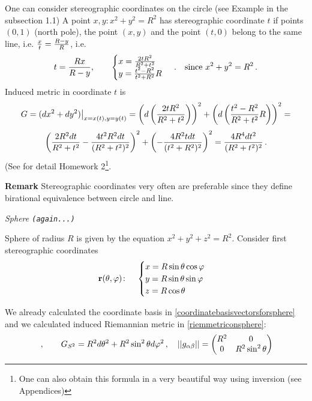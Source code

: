 \documentclass[12pt]{article}
\theoremstyle{theorem}
\numberwithin{equation}{section}
\begin{document}
One can consider stereographic coordinates on the circle (see Example in the subsection 1.1)
A point $x,y\colon x^2+y^2=R^2$ has stereographic coordinate $t$ if points $(0,1)$ (north pole),
the point $(x,y)$ and the point $(t,0)$ belong to the same line, i.e.
     ${x\over t}={R-y\over R}$, i.e.
              $$
     t={Rx\over R-y}, \qquad \begin{cases}
      x={2tR^2\over R^2+t^2}\cr
      y={t^2-R^2\over t^2+R^2}R\cr
      \end{cases}\,. \quad{\rm since\,\,} x^2+y^2=R^2\,.
                   $$
 Induced metric in coordinate $t$ is
               $$
                       G=(dx^2+dy^2)\big\vert_{x=x(t),y=y(t)}=
\left(d\left(2tR^2\over R^2+t^2\right)\right)^2+
         \left(d\left({t^2-R^2\over R^2+t^2}R\right)\right)^2=
         $$
         \begin{equation}\label{circleinstereographiccoordinates}
       \left({2R^2dt\over R^2+t^2}-{4t^2R^2dt\over (R^2+t^2)^2}\right)^2+
         \left(-{4R^2 tdt\over (t^2+R^2)^2}\right)^2=
         {4R^4dt^2\over (R^2+t^2)^2}\,.
               \end{equation}
(See for detail Homework 2\footnote{ One can also 
obtain this formula in a very beautiful 
way using inversion (see Appendices)}.

{\bf Remark} Stereographic coordinates very often are preferable since
 they define birational equivalence between circle and line.


\m

 \centerline {\it Sphere {\tt (again...)}} 
  Sphere of radius $R$ is given by the
equation $x^2+y^2+z^2=R^2$.
Consider first stereographic coordinates 
 \begin{equation}\label{surfacesphere}
  {\bf r}(\theta,\varphi)\colon\quad
  \begin{cases}
  x=R\sin\theta\cos\varphi\\
  y=R\sin\theta\sin\varphi\\
  z=R\cos\theta\\
  \end{cases}
\end{equation}

 We already calculated the coordinate basis
in \eqref{coordinatebasisvectorsforsphere}
and we calculated induced Riemannian metric
in \eqref{riemmetriconsphere}:
   \begin{equation}
 \label{firtsquadraticformforsphere(diff)}\,,\qquad
      G_{S^2}=
R^2d\theta^2+R^2\sin^2\theta d\varphi^2\,,\quad
                        ||g_{\alpha\beta}||=
   \begin{pmatrix}
   R^2 & 0 \cr
   0&  R^2\sin^2\theta \cr
   \end{pmatrix}
                       \end{equation}
\end{document}
